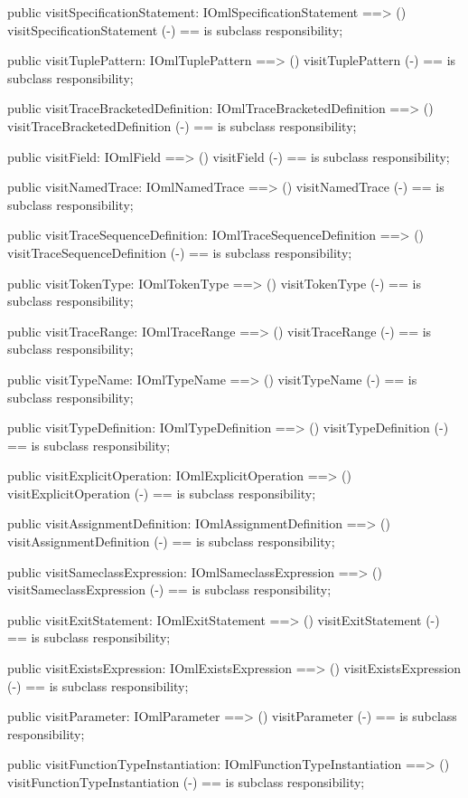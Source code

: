 \begin{vdm_al}
  public visitSpecificationStatement: IOmlSpecificationStatement ==> ()
  visitSpecificationStatement (-) == is subclass responsibility;

  public visitTuplePattern: IOmlTuplePattern ==> ()
  visitTuplePattern (-) == is subclass responsibility;

  public visitTraceBracketedDefinition: IOmlTraceBracketedDefinition ==> ()
  visitTraceBracketedDefinition (-) == is subclass responsibility;

  public visitField: IOmlField ==> ()
  visitField (-) == is subclass responsibility;

  public visitNamedTrace: IOmlNamedTrace ==> ()
  visitNamedTrace (-) == is subclass responsibility;

  public visitTraceSequenceDefinition: IOmlTraceSequenceDefinition ==> ()
  visitTraceSequenceDefinition (-) == is subclass responsibility;

  public visitTokenType: IOmlTokenType ==> ()
  visitTokenType (-) == is subclass responsibility;

  public visitTraceRange: IOmlTraceRange ==> ()
  visitTraceRange (-) == is subclass responsibility;

  public visitTypeName: IOmlTypeName ==> ()
  visitTypeName (-) == is subclass responsibility;

  public visitTypeDefinition: IOmlTypeDefinition ==> ()
  visitTypeDefinition (-) == is subclass responsibility;

  public visitExplicitOperation: IOmlExplicitOperation ==> ()
  visitExplicitOperation (-) == is subclass responsibility;

  public visitAssignmentDefinition: IOmlAssignmentDefinition ==> ()
  visitAssignmentDefinition (-) == is subclass responsibility;

  public visitSameclassExpression: IOmlSameclassExpression ==> ()
  visitSameclassExpression (-) == is subclass responsibility;

  public visitExitStatement: IOmlExitStatement ==> ()
  visitExitStatement (-) == is subclass responsibility;

  public visitExistsExpression: IOmlExistsExpression ==> ()
  visitExistsExpression (-) == is subclass responsibility;

  public visitParameter: IOmlParameter ==> ()
  visitParameter (-) == is subclass responsibility;

  public visitFunctionTypeInstantiation: IOmlFunctionTypeInstantiation ==> ()
  visitFunctionTypeInstantiation (-) == is subclass responsibility;


\end{vdm_al}
